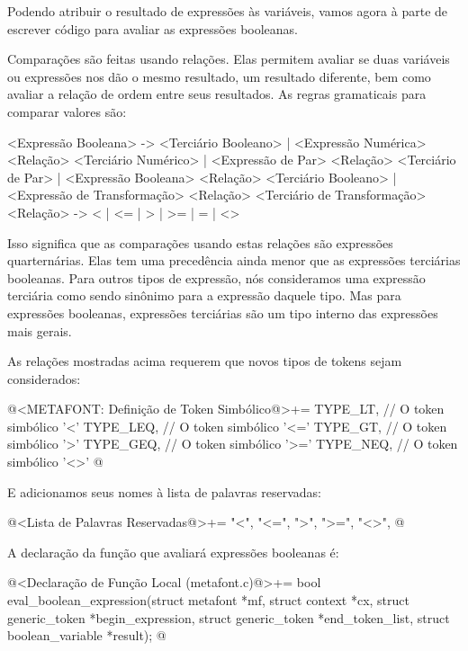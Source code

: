 {Podendo atribuir o resultado de expressões às variáveis, vamos agora à
parte de escrever código para avaliar as expressões booleanas.


Comparações são feitas usando relações. Elas permitem avaliar se duas
variáveis ou expressões nos dão o mesmo resultado, um resultado
diferente, bem como avaliar a relação de ordem entre seus
resultados. As regras gramaticais para comparar valores são:

\alinhaverbatim
<Expressão Booleana> -> <Terciário Booleano> |
                        <Expressão Numérica> <Relação> <Terciário Numérico> |
                        <Expressão de Par> <Relação> <Terciário de Par>     |
                        <Expressão Booleana> <Relação> <Terciário Booleano> |
                        <Expressão de Transformação> <Relação>
                                           <Terciário de Transformação>
<Relação> -> < | <= | > | >= | = | <>
\alinhanormal

Isso significa que as comparações usando estas relações são expressões
quarternárias. Elas tem uma precedência ainda menor que as expressões
terciárias booleanas. Para outros tipos de expressão, nós consideramos
uma expressão terciária como sendo sinônimo para a expressão daquele
tipo. Mas para expressões booleanas, expressões terciárias são um tipo
interno das expressões mais gerais.

As relações mostradas acima requerem que novos tipos de tokens sejam
considerados:

\iniciocodigo
@<METAFONT: Definição de Token Simbólico@>+=
TYPE_LT,                    // O token simbólico '<'
TYPE_LEQ,                   // O token simbólico '<='
TYPE_GT,                    // O token simbólico '>'
TYPE_GEQ,                   // O token simbólico '>='
TYPE_NEQ,                   // O token simbólico '<>'
@
\fimcodigo

E adicionamos seus nomes à lista de palavras reservadas:

\iniciocodigo
@<Lista de Palavras Reservadas@>+=
"<", "<=", ">", ">=", "<>",
@
\fimcodigo

A declaração da função que avaliará expressões booleanas é:

\iniciocodigo
@<Declaração de Função Local (metafont.c)@>+=
bool eval_boolean_expression(struct metafont *mf, struct context *cx,
                             struct generic_token *begin_expression,
                             struct generic_token *end_token_list,
                             struct boolean_variable *result);
@
\fimcodigo

}
